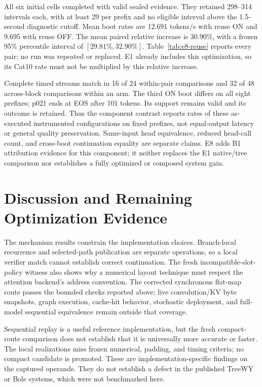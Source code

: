 \documentclass[conference]{IEEEtran}
\begin{document}
All six initial cells completed with valid sealed evidence. They retained 298--314 intervals each, with at least 29 per prefix and no eligible interval above the 1.5-second diagnostic cutoff. Mean boot rates are 12.691 tokens/s with reuse ON and 9.695 with reuse OFF. The mean paired relative increase is 30.90\%, with a frozen 95\% percentile interval of $[29.81\%,32.90\%]$. Table~\ref{tab:e8-reuse} reports every pair; no run was repeated or replaced. E1 already includes this optimization, so its Cat10 rate must not be multiplied by this relative increase.

Complete timed streams match in 16 of 24 within-pair comparisons and 32 of 48 across-block comparisons within an arm. The third ON boot differs on all eight prefixes; p021 ends at EOS after 101 tokens. Its support remains valid and its outcome is retained. Thus the component contrast reports rates of these as-executed instrumented configurations on fixed prefixes, not equal-output latency or general quality preservation. Same-input head equivalence, reduced head-call count, and cross-boot continuation equality are separate claims. E8 adds B1 attribution evidence for this component; it neither replaces the E1 native/tree comparison nor establishes a fully optimized or composed system gain.

\section{Discussion and Remaining Optimization Evidence}
\label{sec:planned}
The mechanism results constrain the implementation choices. Branch-local recurrence and selected-path publication are separate operations, so a local verifier match cannot establish correct continuation. The fresh incompatible-slot-policy witness also shows why a numerical layout technique must respect the attention backend's address convention. The corrected synchronous flat-map route passes the bounded checks reported above; live convolution/KV byte snapshots, graph execution, cache-hit behavior, stochastic deployment, and full-model sequential equivalence remain outside that coverage.

Sequential replay is a useful reference implementation, but the fresh compact-route comparison does not establish that it is universally more accurate or faster. The local realizations miss frozen numerical, padding, and timing criteria; no compact candidate is promoted. These are implementation-specific findings on the captured operands. They do not establish a defect in the published TreeWY or Bole systems, which were not benchmarked here.
\end{document}
